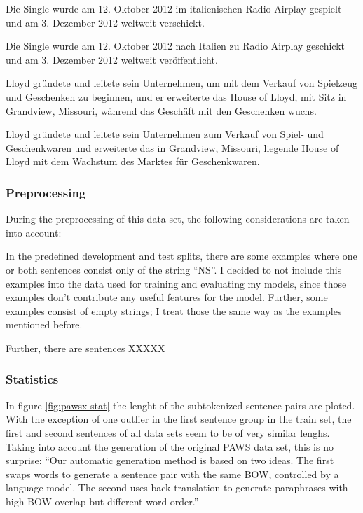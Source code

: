 \begin{examples}
  \item \label{itm:paws-x1} Die Single wurde am 12. Oktober 2012 im italienischen Radio Airplay gespielt und am 3. Dezember 2012 weltweit verschickt.

  Die Single wurde am 12. Oktober 2012 nach Italien zu Radio Airplay geschickt und am 3. Dezember 2012 weltweit veröffentlicht.
  \item \label{itm:paws-x2} Lloyd gründete und leitete sein Unternehmen, um mit dem Verkauf von Spielzeug und Geschenken zu beginnen, und er erweiterte das House of Lloyd, mit Sitz in Grandview, Missouri, während das Geschäft mit den Geschenken wuchs.

  Lloyd gründete und leitete sein Unternehmen zum Verkauf von Spiel- und Geschenkwaren und erweiterte das in Grandview, Missouri, liegende House of Lloyd mit dem Wachstum des Marktes für Geschenkwaren.
\end{examples}

\subsubsection{Preprocessing}

During the preprocessing of this data set, the following considerations are taken into account:

In the predefined development and test splits, there are some examples where one or both sentences
consist
only of the string ``NS''.
I decided to not include this examples into the data used for training and evaluating my models,
since
those examples don't contribute any useful features for the model.
Further, some examples consist of empty strings; I treat those the same way as the examples
mentioned before.

Further, there are sentences XXXXX

\subsubsection{Statistics}

In figure \ref{fig:pawsx-stat} the lenght of the subtokenized sentence pairs are ploted. With
the exception of one outlier in the first sentence group in the train set, the first and second
sentences of all data sets seem to be of very similar lenghs. Taking into account the generation
of the original PAWS data set, this is no surprise: ``Our automatic generation method is based
on two ideas. The first swaps words to generate a sentence pair with the same BOW, controlled by
a language model. The second uses back translation to generate paraphrases with high BOW overlap
but different word order.'' \citep{zhang2019paws}

